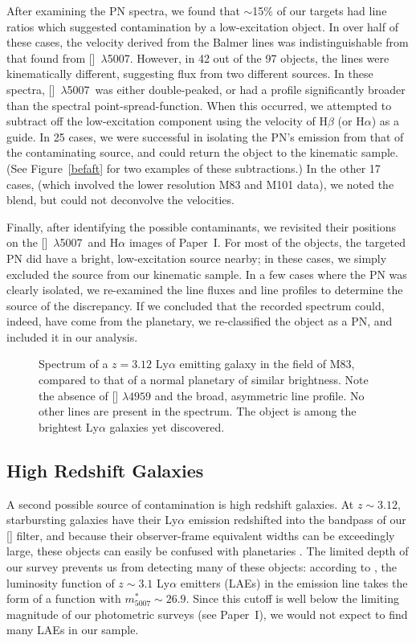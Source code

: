 \documentclass[12pt,preprint]{emulateapj}
\newcommand{\Oline}{[\ion{O}{3}]~$\lambda$5007}
\begin{document}
After examining the PN spectra, we found that $\sim$15\% of our targets had line ratios which suggested contamination by a low-excitation object.  In over half of these cases, the velocity derived from the Balmer lines was indistinguishable from that found from \Oline.  However, in 42 out of the 97 objects, the lines were kinematically different, suggesting flux from two different sources.  In these spectra, \Oline\ was either double-peaked, or had a profile significantly broader than the spectral point-spread-function.  When this occurred, we attempted to subtract off the low-excitation component using the velocity of H$\beta$ (or H$\alpha$) as a guide.  In 25 cases, we were successful in isolating the PN's emission from that of the contaminating source, and could return the object to the kinematic sample.  (See Figure~\ref{befaft} for two examples of these subtractions.)  In the other 17 cases, (which involved the lower resolution M83 and M101 data), we noted the blend, but could not deconvolve the velocities.

Finally, after identifying the possible contaminants, we revisited their positions on the \Oline\ and H$\alpha$ images of Paper~I\null.  For most of the objects, the targeted PN did have a bright, low-excitation source nearby; in these cases, we simply excluded the source from our kinematic sample.  In a few cases where the PN was clearly isolated, we re-examined the line fluxes and line profiles to determine the source of the discrepancy. If we concluded that the recorded spectrum could, indeed, have come from the planetary, we re-classified the object as a PN, and included it in our analysis.

\begin{figure}[b]
\caption{Spectrum of a $z = 3.12$ Ly$\alpha$ emitting galaxy in the field of M83, compared to that of a normal planetary of similar brightness.  Note the absence of [] $\lambda 4959$ and the broad, asymmetric line profile.  No other lines are present in the spectrum.  The object is among the 
brightest Ly$\alpha$ galaxies yet discovered. \label{Highz} }
\end{figure}

\subsection{High Redshift Galaxies}
A second possible source of contamination is high redshift galaxies.  At $z \sim 3.12$, starbursting galaxies have their Ly$\alpha$ emission redshifted into the bandpass of our [] filter, and because their observer-frame equivalent widths can be exceedingly large, these objects can easily be confused with planetaries \citep{arnaboldi02, ipn3}.  The limited depth of our survey prevents us from detecting many of these objects:  according to \citet{gronwall}, the luminosity function of $z \sim 3.1$ Ly$\alpha$ emitters (LAEs) in the emission line takes the form of a \citet{schechter} function with $m_{5007}^* \sim 26.9$.  Since this cutoff is well below the limiting magnitude of our photometric surveys (see Paper~I), we would not expect to find many LAEs in our sample.
\end{document}
